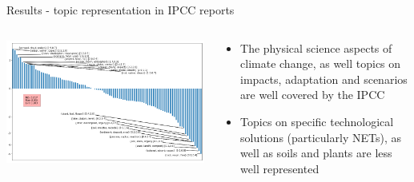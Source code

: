 \documentclass[9pt]{beamer}
\begin{document}
\begin{frame}{Results - topic representation in IPCC reports}

\begin{columns}
	\begin{column}{0.7\linewidth}
		\begin{center}
			\includegraphics[width=\linewidth]{../plots/ipcc_representation/ipcc_rep_662_all.png}
		\end{center}
	\end{column}
	\begin{column}{0.3\linewidth}
		\begin{center}
			\begin{itemize}
				\item The physical science aspects of climate change, as well topics on impacts, adaptation and scenarios are well covered by the IPCC
				\item Topics on specific technological solutions (particularly NETs), as well as soils and plants are less well represented
			\end{itemize}
		\end{center}
	\end{column}
\end{columns}

\end{frame}
\end{document}
